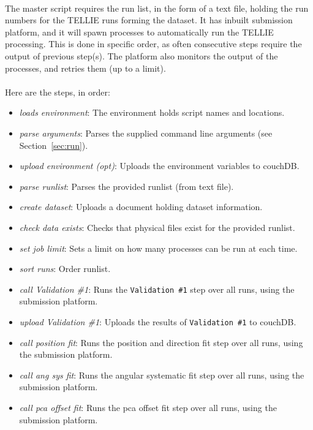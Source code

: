 \documentclass[12pt]{article}
\begin{document}
\paragraph{}
The master script requires the run list, in the form of a text file, holding the run numbers for the TELLIE runs forming the dataset. It has inbuilt submission platform, and it will spawn processes to automatically run the TELLIE processing. This is done in specific order, as often consecutive steps require the output of previous step(s). The platform also monitors the output of the processes, and retries them (up to a limit).

\paragraph{}
Here are the steps, in order:
\begin{itemize}
	\item \textit{loads environment}: The environment holds script names and locations.
	\item \textit{parse arguments}: Parses the supplied command line arguments (see Section~\ref{sec:run}).
	\item \textit{upload environment (opt)}: Uploads the environment variables to couchDB.  
	\item \textit{parse runlist}: Parses the provided runlist (from text file). 
	\item \textit{create dataset}: Uploads a document holding dataset information. 
	\item \textit{check data exists}: Checks that physical files exist for the provided runlist. 
	\item \textit{set job limit}: Sets a limit on how many processes can be run at each time. 
	\item \textit{sort runs}: Order runlist. 
	\item \textit{call Validation \#1}: Runs the \texttt{Validation \#1} step over all runs, using the submission platform. 
	\item \textit{upload Validation \#1}: Uploads the results of \texttt{Validation \#1} to couchDB.
	\item \textit{call position fit}: Runs the position and direction fit step over all runs, using the submission platform. 
	\item \textit{call ang sys fit}: Runs the angular systematic fit step over all runs, using the submission platform. 
	\item \textit{call pca offset fit}: Runs the pca offset fit step over all runs, using the submission platform. 

\end{itemize}
\end{document}
